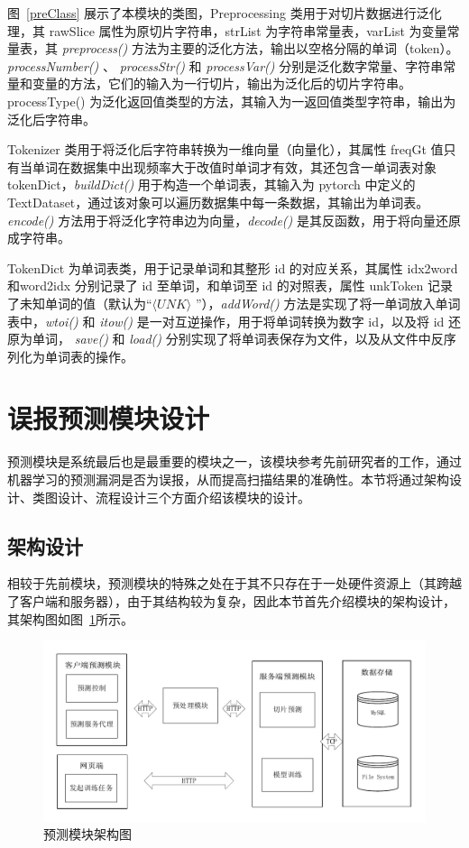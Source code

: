 图~\ref{preClass} 展示了本模块的类图，Preprocessing 类用于对切片数据进行泛化理，其 rawSlice 属性为原切片字符串，strList 为字符串常量表，varList 为变量常量表，其 \textit{preprocess()} 方法为主要的泛化方法，输出以空格分隔的单词（token）。\textit{processNumber()} 、 \textit{processStr()} 和 \textit{processVar()} 分别是泛化数字常量、字符串常量和变量的方法，它们的输入为一行切片，输出为泛化后的切片字符串。processType() 为泛化返回值类型的方法，其输入为一返回值类型字符串，输出为泛化后字符串。

Tokenizer 类用于将泛化后字符串转换为一维向量（向量化），其属性 freqGt 值只有当单词在数据集中出现频率大于改值时单词才有效，其还包含一单词表对象 tokenDict，\textit{buildDict()} 用于构造一个单词表，其输入为 pytorch 中定义的TextDataset，通过该对象可以遍历数据集中每一条数据，其输出为单词表。\textit{encode()} 方法用于将泛化字符串边为向量，\textit{decode()} 是其反函数，用于将向量还原成字符串。

TokenDict 为单词表类，用于记录单词和其整形 id 的对应关系，其属性 idx2word 和word2idx 分别记录了 id 至单词，和单词至 id 的对照表，属性 unkToken 记录了未知单词的值（默认为“$\langle UNK \rangle$ ”），\textit{addWord()} 方法是实现了将一单词放入单词表中，\textit{wtoi()} 和 \textit{itow()} 是一对互逆操作，用于将单词转换为数字 id，以及将 id 还原为单词， \textit{save()} 和 \textit{load()} 分别实现了将单词表保存为文件，以及从文件中反序列化为单词表的操作。

\section{误报预测模块设计}

预测模块是系统最后也是最重要的模块之一，该模块参考先前研究者的工作，通过机器学习的预测漏洞是否为误报，从而提高扫描结果的准确性。本节将通过架构设计、类图设计、流程设计三个方面介绍该模块的设计。\\

\subsection{架构设计}

相较于先前模块，预测模块的特殊之处在于其不只存在于一处硬件资源上（其跨越了客户端和服务器），由于其结构较为复杂，因此本节首先介绍模块的架构设计，其架构图如图~\ref{predictArch}所示。

\begin{figure}[!htbp]
    \centering
    \includegraphics[width=0.8\linewidth]{FIGs/chapter3/predict-architecture.pdf}
    \caption{预测模块架构图}\label{predictArch}
\end{figure}


